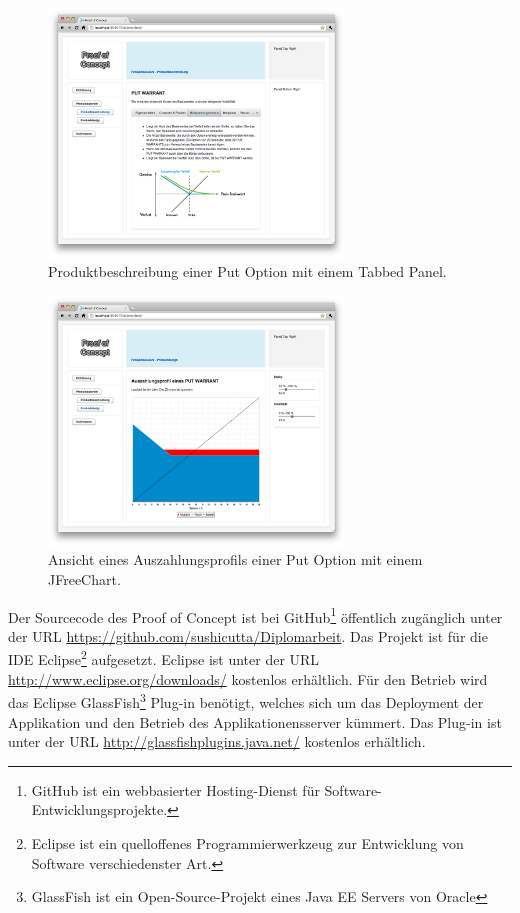 \begin{figure}[htb]
  \begin{center}
    \includegraphics[width=0.7\textwidth]{./image/POC/poc2.png}
    \caption{Produktbeschreibung einer Put Option mit einem Tabbed Panel.}
    \label{img:poc2}
  \end{center}
\end{figure}

\begin{figure}[htb]
  \begin{center}
    \includegraphics[width=0.7\textwidth]{./image/POC/poc3.png}
    \caption{Ansicht eines Auszahlungsprofils einer Put Option mit einem
    JFreeChart.}
    \label{img:poc3}
  \end{center}
\end{figure}

Der Sourcecode des Proof of Concept ist bei GitHub\footnote{GitHub ist ein
webbasierter Hosting-Dienst für Software-Entwicklungsprojekte.} öffentlich
zugänglich unter der URL \url{https://github.com/sushicutta/Diplomarbeit}. Das
Projekt ist für die \ac{IDE} Eclipse\footnote{Eclipse ist ein quelloffenes
Programmierwerkzeug zur Entwicklung von Software verschiedenster Art.}
aufgesetzt. Eclipse ist unter der URL
\url{http://www.eclipse.org/downloads/} kostenlos erhältlich. Für den Betrieb
wird das Eclipse GlassFish\footnote{GlassFish ist ein Open-Source-Projekt eines
Java EE Servers von Oracle} Plug-in benötigt, welches sich um das Deployment
der Applikation und den Betrieb des Applikationensserver kümmert. Das Plug-in
ist unter der URL \url{http://glassfishplugins.java.net/} kostenlos erhältlich.
